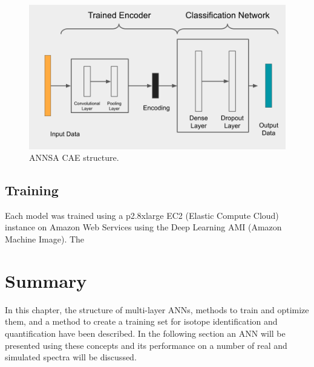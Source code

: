 \begin{figure}[H]
\centering
\includegraphics[trim=0 0 0 0,clip,width=0.9\linewidth]{images/annsa_caednn.png}
\caption{ANNSA CAE structure.}
\label{fig:annsa_caednn}
\end{figure}


\subsection{Training}

Each model was trained using a p2.8xlarge EC2 (Elastic Compute Cloud) instance on Amazon Web Services using the Deep Learning AMI (Amazon Machine Image). The 

\section{Summary}

In this chapter, the structure of multi-layer ANNs, methods to train and optimize them, and a method to create a training set for isotope identification and quantification have been described. In the following section an ANN will be presented using these concepts and its performance on a number of real and simulated spectra will be discussed. 











